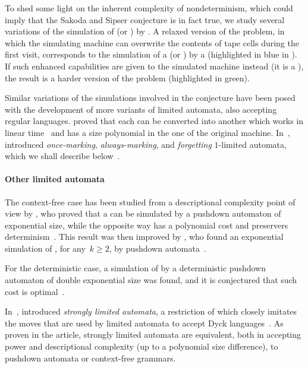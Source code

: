 To shed some light on the inherent complexity of nondeterminism, which could imply that the Sakoda and Sipser conjecture is in fact true, we study several variations of the simulation of \TNFA (or \ONFA) by \TDFA.
A relaxed version of the problem, in which the simulating machine can overwrite the contents of tape cells during the first visit, corresponds to the simulation of a \TNFA (or \ONFA) by a \ODLA (highlighted in blue in ).
If such enhanced capabilities are given to the simulated machine instead (\ie it is a \OLA), the result is a harder version of the problem (highlighted in green).

Similar variations of the simulations involved in the conjecture have been posed with the development of more variants of limited automata, also accepting regular languages.
\citeauthor{GuiPri19} proved that each \OLA can be converted into another \OLA which works in linear time~\cite{GuiPri19} and has a size polynomial in the one of the original machine.
In~\citeyear{PigPri23a}, \citeauthor{PigPri23a} introduced \emph{once-marking}, \emph{always-marking}, and \emph{forgetting} $1$-limited automata, which we shall describe below~\cite{PigPri23a,PigPri23}.


\paragraph{Other limited automata}
The context-free case has been studied from a descriptional complexity point of view by \citeauthor{PigPis15}, who proved that a  can be simulated by a pushdown automaton of exponential size, while the opposite way has a polynomial cost and preservers determinism~\cite{PigPis15}.
This result was then improved by \citeauthor{KutPig+18}, who found an exponential simulation of \kLAs, for any~$k\ge2$, by pushdown automata~\cite{KutPig+18}.

For the deterministic case, a simulation of  by a deterministic pushdown automaton of double exponential size was found, and it is conjectured that such cost is optimal~\cite{PigPis15}.

In~\citeyear{Pig16}, \citeauthor{Pig16} introduced \emph{strongly limited automata}, a restriction of  which closely imitates the moves that are used by limited automata to accept Dyck languages~\cite{Pig16}.
As proven in the article, strongly limited automata are equivalent, both in accepting power and descriptional complexity (up to a polynomial size difference), to pushdown automata or context-free grammars.

